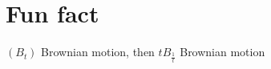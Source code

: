 \section{Fun fact}\label{sec:fun-fact}

\begin{fact}
    $(B_t)$ Brownian motion, then $t B_{\frac{1}{t}}$ Brownian motion
\end{fact}